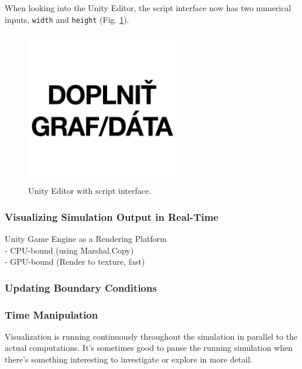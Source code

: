 When looking into the Unity Editor, the script interface now has two numerical inputs, \texttt{width} and \texttt{height} (Fig. \ref{fig:unity-script-interface-public-vars}).

\begin{figure}[!ht]
	\centering
	\includegraphics[width=0.6\textwidth]{figures/empty.jpg}
	\caption{Unity Editor with script interface.}
	\label{fig:unity-script-interface-public-vars}
\end{figure}

\subsubsection{Visualizing Simulation Output in Real-Time}

Unity Game Engine as a Rendering Platform \\

- CPU-bound (using Marshal.Copy) \\
- GPU-bound (Render to texture, fast) \\

\subsubsection{Updating Boundary Conditions}

\subsubsection{Time Manipulation}

Visualization is running continuously throughout the simulation in parallel to the actual computations. It's sometimes good to pause the running simulation when there's something interesting to investigate or explore in more detail.

